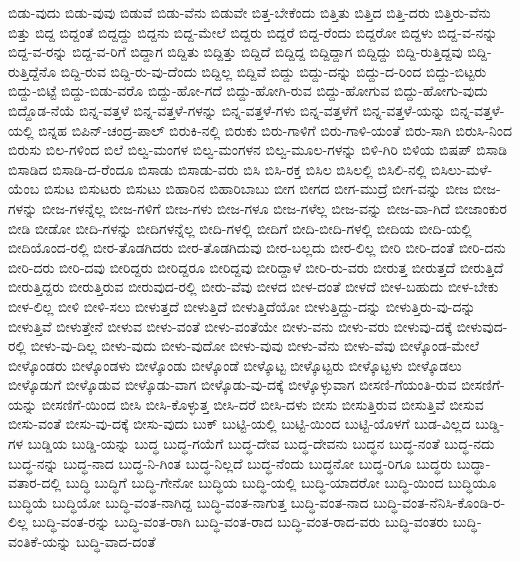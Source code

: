 {ಬಿಡು-ವುದು
ಬಿಡು-ವುವು
ಬಿಡುವೆ
ಬಿಡು-ವೆನು
ಬಿಡುವೇ
ಬಿತ್ತ-ಬೇಕೆಂದು
ಬಿತ್ತಿತು
ಬಿತ್ತಿದ
ಬಿತ್ತಿ-ದರು
ಬಿತ್ತಿರು-ವೆನು
ಬಿತ್ತು
ಬಿದ್ದ
ಬಿದ್ದಂತೆ
ಬಿದ್ದದ್ದು
ಬಿದ್ದನು
ಬಿದ್ದ-ಮೇಲೆ
ಬಿದ್ದರು
ಬಿದ್ದರೆ
ಬಿದ್ದ-ರೆಂದು
ಬಿದ್ದರೋ
ಬಿದ್ದಳು
ಬಿದ್ದ-ವ-ನನ್ನು
ಬಿದ್ದ-ವ-ರನ್ನು
ಬಿದ್ದ-ವ-ರಿಗೆ
ಬಿದ್ದಾಗ
ಬಿದ್ದಿತು
ಬಿದ್ದಿತ್ತು
ಬಿದ್ದಿದೆ
ಬಿದ್ದಿದ್ದ
ಬಿದ್ದಿದ್ದಾಗ
ಬಿದ್ದಿದ್ದು
ಬಿದ್ದಿ-ರುತ್ತಿದ್ದವು
ಬಿದ್ದಿ-ರುತ್ತಿದ್ದೆನೊ
ಬಿದ್ದಿ-ರುವ
ಬಿದ್ದಿ-ರು-ವು-ದೆಂದು
ಬಿದ್ದಿಲ್ಲ
ಬಿದ್ದಿವೆ
ಬಿದ್ದು
ಬಿದ್ದು-ದನ್ನು
ಬಿದ್ದು-ದ-ರಿಂದ
ಬಿದ್ದು-ಬಿಟ್ಟರು
ಬಿದ್ದು-ಬಿಟ್ಟೆ
ಬಿದ್ದು-ಬಿಡು-ವರೊ
ಬಿದ್ದು-ಹೋ-ಗದೆ
ಬಿದ್ದು-ಹೋಗಿ-ರುವ
ಬಿದ್ದು-ಹೋಗುವ
ಬಿದ್ದು-ಹೋಗು-ವುದು
ಬಿದ್ದೊಡ-ನೆಯೆ
ಬಿನ್ನ-ವತ್ತಳೆ
ಬಿನ್ನ-ವತ್ತಳೆ-ಗಳನ್ನು
ಬಿನ್ನ-ವತ್ತಳೆ-ಗಳು
ಬಿನ್ನ-ವತ್ತಳೆಗೆ
ಬಿನ್ನ-ವತ್ತಳೆ-ಯನ್ನು
ಬಿನ್ನ-ವತ್ತಳೆ-ಯಲ್ಲಿ
ಬಿನ್ನಹ
ಬಿಪಿನ್-ಚಂದ್ರ-ಪಾಲ್
ಬಿರುಕಿ-ನಲ್ಲಿ
ಬಿರುಕು
ಬಿರು-ಗಾಳಿಗೆ
ಬಿರು-ಗಾಳಿ-ಯಂತೆ
ಬಿರು-ಸಾಗಿ
ಬಿರುಸಿ-ನಿಂದ
ಬಿರುಸು
ಬಿಲ-ಗಳಿಂದ
ಬಿಲೆ
ಬಿಲ್ವ-ಮಂಗಳ
ಬಿಲ್ವ-ಮಂಗಳನ
ಬಿಲ್ವ-ಮೂಲ-ಗಳನ್ನು
ಬಿಳಿ-ಗಿರಿ
ಬಿಳಿಯ
ಬಿಷಪ್
ಬಿಸಾಡಿ
ಬಿಸಾಡಿದ
ಬಿಸಾಡಿ-ದ-ರೆಂದೂ
ಬಿಸಾಡು
ಬಿಸಾಡು-ವರು
ಬಿಸಿ
ಬಿಸಿ-ರಕ್ತ
ಬಿಸಿಲ
ಬಿಸಿಲಲ್ಲಿ
ಬಿಸಿಲಿ-ನಲ್ಲಿ
ಬಿಸಿಲು-ಮಳೆ-ಯೆಂಬ
ಬಿಸುಟ
ಬಿಸುಟರು
ಬಿಸುಟು
ಬಿಹಾರಿನ
ಬಿಹಾರಿಬಾಬು
ಬೀಗ
ಬೀಗದ
ಬೀಗ-ಮುದ್ರೆ
ಬೀಗ-ವನ್ನು
ಬೀಜ
ಬೀಜ-ಗಳನ್ನು
ಬೀಜ-ಗಳನ್ನೆಲ್ಲ
ಬೀಜ-ಗಳಿಗೆ
ಬೀಜ-ಗಳು
ಬೀಜ-ಗಳೂ
ಬೀಜ-ಗಳೆಲ್ಲ
ಬೀಜ-ವನ್ನು
ಬೀಜ-ವಾ-ಗಿದೆ
ಬೀಜಾಂಕುರ
ಬೀಡಿ
ಬೀಡೋ
ಬೀದಿ-ಗಳನ್ನು
ಬೀದಿಗಳನ್ನೆಲ್ಲ
ಬೀದಿ-ಗಳಲ್ಲಿ
ಬೀದಿಗೆ
ಬೀದಿ-ಬೀದಿ-ಗಳಲ್ಲಿ
ಬೀದಿಯ
ಬೀದಿ-ಯಲ್ಲಿ
ಬೀದಿಯೊಂದ-ರಲ್ಲಿ
ಬೀರ-ತೊಡಗಿದರು
ಬೀರ-ತೊಡಗಿದುವು
ಬೀರ-ಬಲ್ಲದು
ಬೀರ-ಲಿಲ್ಲ
ಬೀರಿ
ಬೀರಿ-ದಂತೆ
ಬೀರಿ-ದನು
ಬೀರಿ-ದರು
ಬೀರಿ-ದವು
ಬೀರಿದ್ದರು
ಬೀರಿದ್ದರೂ
ಬೀರಿದ್ದವು
ಬೀರಿದ್ದಾಳೆ
ಬೀರಿ-ರು-ವರು
ಬೀರುತ್ತ
ಬೀರುತ್ತದೆ
ಬೀರುತ್ತಿದೆ
ಬೀರುತ್ತಿದ್ದರು
ಬೀರುತ್ತಿರುವ
ಬೀರುವುದ-ರಲ್ಲಿ
ಬೀರು-ವೆವು
ಬೀಳದ
ಬೀಳ-ದಂತೆ
ಬೀಳದೆ
ಬೀಳ-ಬಹುದು
ಬೀಳ-ಬೇಕು
ಬೀಳ-ಲಿಲ್ಲ
ಬೀಳಿ
ಬೀಳಿ-ಸಲು
ಬೀಳುತ್ತದೆ
ಬೀಳುತ್ತಿದೆ
ಬೀಳುತ್ತಿದೆಯೋ
ಬೀಳುತ್ತಿದ್ದು-ದನ್ನು
ಬೀಳುತ್ತಿರು-ವು-ದನ್ನು
ಬೀಳುತ್ತಿವೆ
ಬೀಳುತ್ತೇನೆ
ಬೀಳುವ
ಬೀಳು-ವಂತೆ
ಬೀಳು-ವಂತೆಯೇ
ಬೀಳು-ವನು
ಬೀಳು-ವರು
ಬೀಳುವು-ದಕ್ಕೆ
ಬೀಳುವುದ-ರಲ್ಲಿ
ಬೀಳು-ವು-ದಿಲ್ಲ
ಬೀಳು-ವುದು
ಬೀಳು-ವುದೋ
ಬೀಳು-ವುವು
ಬೀಳು-ವೆನು
ಬೀಳು-ವೆವು
ಬೀಳ್ಕೊಂಡ-ಮೇಲೆ
ಬೀಳ್ಕೊಂಡರು
ಬೀಳ್ಕೊಂಡಳು
ಬೀಳ್ಕೊಂಡು
ಬೀಳ್ಕೊಂಡೆ
ಬೀಳ್ಕೊಟ್ಟ
ಬೀಳ್ಕೊಟ್ಟರು
ಬೀಳ್ಕೊಟ್ಟಳು
ಬೀಳ್ಕೊಡಲು
ಬೀಳ್ಕೊಡುಗೆ
ಬೀಳ್ಕೊಡುವ
ಬೀಳ್ಕೊಡು-ವಾಗ
ಬೀಳ್ಕೊಡು-ವು-ದಕ್ಕೆ
ಬೀಳ್ಕೊಳ್ಳುವಾಗ
ಬೀಸಣಿ-ಗೆಯಂತಿ-ರುವ
ಬೀಸಣಿಗೆ-ಯನ್ನು
ಬೀಸಣಿಗೆ-ಯಿಂದ
ಬೀಸಿ
ಬೀಸಿ-ಕೊಳ್ಳುತ್ತ
ಬೀಸಿ-ದರೆ
ಬೀಸಿ-ದಳು
ಬೀಸು
ಬೀಸುತ್ತಿರುವ
ಬೀಸುತ್ತಿವೆ
ಬೀಸುವ
ಬೀಸು-ವಂತೆ
ಬೀಸು-ವು-ದಕ್ಕೆ
ಬೀಸು-ವುದು
ಬುಕ್
ಬುಟ್ಟಿ-ಯಲ್ಲಿ
ಬುಟ್ಟಿ-ಯಿಂದ
ಬುಟ್ಟಿ-ಯೊಳಗೆ
ಬುಡ-ವಿಲ್ಲದ
ಬುಡ್ಡಿ-ಗಳ
ಬುಡ್ಡಿಯ
ಬುಡ್ಡಿ-ಯನ್ನು
ಬುದ್ಧ
ಬುದ್ಧ-ಗಯೆಗೆ
ಬುದ್ಧ-ದೇವ
ಬುದ್ಧ-ದೇವನು
ಬುದ್ಧನ
ಬುದ್ಧ-ನಂತೆ
ಬುದ್ಧ-ನದು
ಬುದ್ಧ-ನನ್ನು
ಬುದ್ಧ-ನಾದ
ಬುದ್ಧ-ನಿ-ಗಿಂತ
ಬುದ್ಧ-ನಿಲ್ಲದೆ
ಬುದ್ಧ-ನೆಂದು
ಬುದ್ಧನೋ
ಬುದ್ಧ-ರಿಗೂ
ಬುದ್ಧರು
ಬುದ್ಧಾ-ವತಾರ-ದಲ್ಲಿ
ಬುದ್ಧಿ
ಬುದ್ಧಿಗೆ
ಬುದ್ಧಿ-ಗೇನೋ
ಬುದ್ಧಿಯ
ಬುದ್ಧಿ-ಯಲ್ಲಿ
ಬುದ್ಧಿ-ಯಾದರೋ
ಬುದ್ಧಿ-ಯಿಂದ
ಬುದ್ಧಿಯೂ
ಬುದ್ಧಿಯೆ
ಬುದ್ಧಿಯೋ
ಬುದ್ಧಿ-ವಂತ-ನಾಗಿದ್ದ
ಬುದ್ಧಿ-ವಂತ-ನಾಗುತ್ತ
ಬುದ್ಧಿ-ವಂತ-ನಾದ
ಬುದ್ಧಿ-ವಂತ-ನೆನಿಸಿ-ಕೊಂಡಿ-ರ-ಲಿಲ್ಲ
ಬುದ್ಧಿ-ವಂತ-ರನ್ನು
ಬುದ್ಧಿ-ವಂತ-ರಾಗಿ
ಬುದ್ಧಿ-ವಂತ-ರಾದ
ಬುದ್ಧಿ-ವಂತ-ರಾದ-ವರು
ಬುದ್ಧಿ-ವಂತರು
ಬುದ್ಧಿ-ವಂತಿಕೆ-ಯನ್ನು
ಬುದ್ಧಿ-ವಾದ-ದಂತೆ
}
